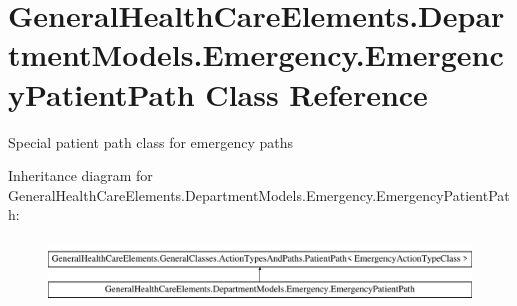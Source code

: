 \hypertarget{class_general_health_care_elements_1_1_department_models_1_1_emergency_1_1_emergency_patient_path}{}\section{General\+Health\+Care\+Elements.\+Department\+Models.\+Emergency.\+Emergency\+Patient\+Path Class Reference}
\label{class_general_health_care_elements_1_1_department_models_1_1_emergency_1_1_emergency_patient_path}


Special patient path class for emergency paths  


Inheritance diagram for General\+Health\+Care\+Elements.\+Department\+Models.\+Emergency.\+Emergency\+Patient\+Path\+:\begin{figure}[H]
\begin{center}
\leavevmode
\includegraphics[height=1.723077cm]{class_general_health_care_elements_1_1_department_models_1_1_emergency_1_1_emergency_patient_path}
\end{center}
\end{figure}
